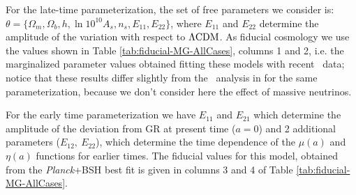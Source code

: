 For the late-time parameterization, the set of free parameters we
consider is: $\theta=\{\Omega_{m},\Omega_{b},h,\ln10^{10}A_{s},n_{s},E_{11},E_{22}\}$,
where $E_{11}$ and $E_{22}$ determine the amplitude of the variation
with respect to $\Lambda\mathrm{CDM}$. As fiducial cosmology we use the values
shown in Table \ref{tab:fiducial-MG-AllCases}, columns 1 and 2, i.e.
the marginalized parameter values obtained fitting these models with
recent \planck\ data; notice that these results differ slightly from
the \planck\ analysis in \cite{planck_collaboration_planck_2016} for
the same parameterization, because we don't consider here the effect
of massive neutrinos.

For the early time parameterization we have $E_{11}$ and $E_{21}$
which determine the amplitude of the deviation from GR at present
time ($a=0$) and 2 additional parameters ($E_{12},\ E_{22}$), which
determine the time dependence of the $\mu(a)$ and $\eta(a)$ functions
for earlier times. The
fiducial values for this model, obtained from the {\it Planck}+BSH best
fit is given in columns 3 and 4 of Table \ref{tab:fiducial-MG-AllCases}.

